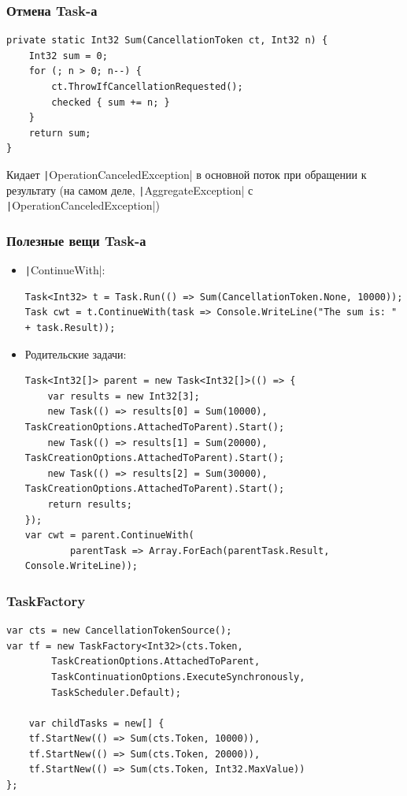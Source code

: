 \documentclass[xetex,mathserif,serif]{beamer}
\begin{document}
	\begin{frame}[fragile]
		\frametitle{Отмена Task-а}
		\begin{verbatim}
private static Int32 Sum(CancellationToken ct, Int32 n) {
    Int32 sum = 0;
    for (; n > 0; n--) {
        ct.ThrowIfCancellationRequested();
        checked { sum += n; } 
    }
    return sum;
}
		\end{verbatim}
		\vspace{3mm}
		Кидает \texttt|OperationCanceledException| в основной поток при обращении к результату (на самом деле, \texttt|AggregateException| с \texttt|OperationCanceledException|)
	\end{frame}

	\begin{frame}[fragile]
		\frametitle{Полезные вещи Task-а}
		\begin{scriptsize}
			\begin{itemize}
				\item \texttt|ContinueWith|:
					\begin{verbatim}
Task<Int32> t = Task.Run(() => Sum(CancellationToken.None, 10000));
Task cwt = t.ContinueWith(task => Console.WriteLine("The sum is: " + task.Result));
					\end{verbatim}
				\item Родительские задачи:
					\begin{verbatim}
Task<Int32[]> parent = new Task<Int32[]>(() => {
    var results = new Int32[3];
    new Task(() => results[0] = Sum(10000), TaskCreationOptions.AttachedToParent).Start();
    new Task(() => results[1] = Sum(20000), TaskCreationOptions.AttachedToParent).Start();
    new Task(() => results[2] = Sum(30000), TaskCreationOptions.AttachedToParent).Start();
    return results;
});
var cwt = parent.ContinueWith(
        parentTask => Array.ForEach(parentTask.Result, Console.WriteLine));
					\end{verbatim}
			\end{itemize}
		\end{scriptsize}
	\end{frame}

	\begin{frame}[fragile]
		\frametitle{TaskFactory}
		\begin{verbatim}
var cts = new CancellationTokenSource();
var tf = new TaskFactory<Int32>(cts.Token,   
        TaskCreationOptions.AttachedToParent,
        TaskContinuationOptions.ExecuteSynchronously, 
        TaskScheduler.Default);

    var childTasks = new[] {
    tf.StartNew(() => Sum(cts.Token, 10000)),
    tf.StartNew(() => Sum(cts.Token, 20000)),
    tf.StartNew(() => Sum(cts.Token, Int32.MaxValue)) 
};
		\end{verbatim}
	\end{frame}
\end{document}
